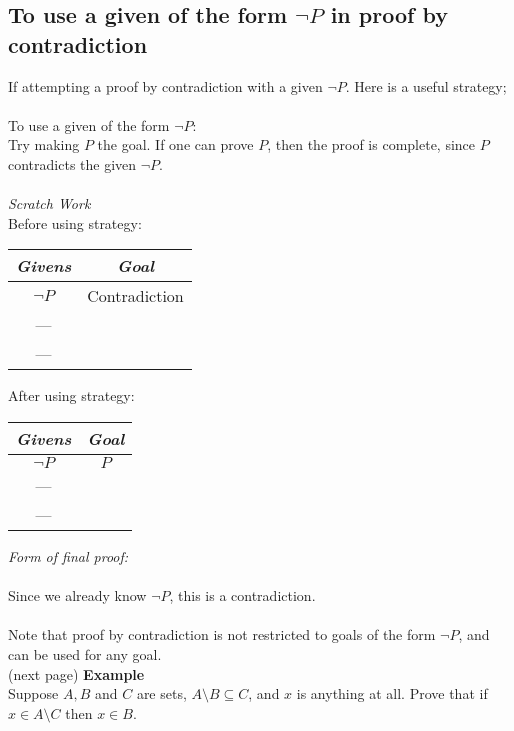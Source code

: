 \documentclass{report}
\begin{document}
\subsection{To use a given of the form $\neg P$ in proof by contradiction}
If attempting a proof by contradiction with a given $\neg P$. Here is a useful strategy;\\
\vspace{1mm}\\
\indent To use a given of the form $\neg P$:\\
\indent Try making $P$ the goal. If one can prove $P$, then the proof is complete, since $P$ contradicts the given $\neg P$.\\
\vspace{1mm}\\
\textit{Scratch Work}\\
Before using strategy:
\begin{center}
\begin{tabular}{c|c}
\textit{Givens}&\textit{Goal}\\
\hline
$\neg P$&Contradiction\\
---&\\
---&
\end{tabular}
\end{center}
After using strategy:
\begin{center}
\begin{tabular}{c|c}
\textit{Givens}&\textit{Goal}\\
\hline
$\neg P$&$P$\\
---&\\
---&
\end{tabular}
\end{center}
\textit{Form of final proof:}\\
\indent{}\\
\indent Since we already know $\neg P$, this is a contradiction.\\
\vspace{1mm}\\
Note that proof by contradiction is not restricted to goals of the form $\neg P$, and can be used for any goal.\\
(next page)\newpage
\noindent\textbf{Example}\\
Suppose $A,B$ and $C$ are sets, $A\setminus B\subseteq C$, and $x$ is anything at all. Prove that if $x\in A\setminus C$ then $x\in B$.\\
\vspace{1mm}\\
\end{document}
